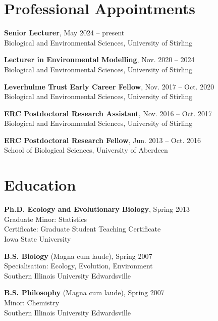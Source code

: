 \documentclass[letterpaper]{article}
\renewenvironment{itemize}{
  \begin{list}{}{
    \setlength{\leftmargin}{1.5em}
  }
}{
  \end{list}
}
\begin{document}
\begin{minipage}{0.65\linewidth}
\section*{Professional Appointments}
\begin{itemize}
	\item{\bf Senior Lecturer}, May 2024 -- present \\
	Biological and Environmental Sciences, University of Stirling
\end{itemize}

\begin{itemize}
	\item{\bf Lecturer in Environmental Modelling}, Nov. 2020 -- 2024 \\
	Biological and Environmental Sciences, University of Stirling
\end{itemize}
\begin{itemize}
	\item{\bf Leverhulme Trust Early Career Fellow}, Nov. 2017 -- Oct. 2020 \\
	Biological and Environmental Sciences, University of Stirling
\end{itemize}
\begin{itemize}
	\item{\bf ERC Postdoctoral Research Assistant}, Nov. 2016 -- Oct. 2017 \\
	Biological and Environmental Sciences, University of Stirling
\end{itemize}
\begin{itemize}
	\item{\bf ERC Postdoctoral Research Fellow}, Jun. 2013 -- Oct. 2016 \\
	School of Biological Sciences, University of Aberdeen
\end{itemize}

\section*{Education}
\begin{itemize}
  \item {\bf Ph.D. Ecology and Evolutionary Biology}, Spring 2013 \\
	Graduate Minor: Statistics \\
	Certificate: Graduate Student Teaching Certificate \\
	Iowa State University
  \item {\bf B.S. Biology} (Magna cum laude), Spring 2007 \\
	Specialisation: Ecology, Evolution, Environment \\
	Southern Illinois University Edwardsville
  \item {\bf B.S. Philosophy} (Magna cum laude), Spring 2007 \\
	Minor: Chemistry \\
	Southern Illinois University Edwardsville
\end{itemize}


\end{minipage}
\end{document}

